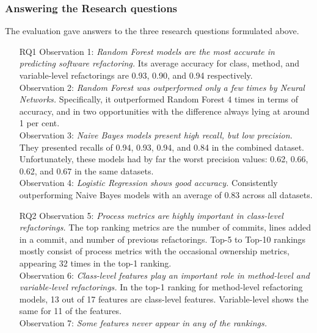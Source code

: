 \subsubsection{Answering the Research questions}
The evaluation gave answers to the three research questions formulated above.
\begin{itemize}
    \item[RQ1] Observation 1: \textit{Random Forest models are the most accurate in predicting software refactoring.} Its average accuracy for class, method, and variable-level refactorings are 0.93, 0.90, and 0.94 respectively.\\Observation 2: \textit{Random Forest was outperformed only a few times by Neural Networks.} Specifically, it outperformed Random Forest 4 times in terms of accuracy, and in two opportunities with the difference always lying at around 1 per cent. \\ Observation 3: \textit{Naive Bayes models present high recall, but low precision.} They presented recalls of 0.94, 0.93, 0.94, and 0.84 in the combined dataset. Unfortunately, these models had by far the worst precision values: 0.62, 0.66, 0.62, and 0.67 in the same datasets. \\ Observation 4: \textit{Logistic Regression shows good accuracy.} Consistently outperforming Naive Bayes models with an average of 0.83 across all datasets.
    \item[RQ2] Observation 5: \textit{Process metrics are highly important in class-level refactorings.} The top ranking metrics are the number of commits, lines added in a commit, and number of previous refactorings. Top-5 to Top-10 rankings mostly consist of process metrics with the occasional ownership metrics, appearing 32 times in the top-1 ranking. \\ Observation 6: \textit{Class-level features play an important role in method-level and variable-level refactorings.} In the top-1 ranking for method-level refactoring models, 13 out of 17 features are class-level features. Variable-level shows the same for 11 of the features. \\ Observation 7: \textit{Some features never appear in any of the rankings.}

\end{itemize}
